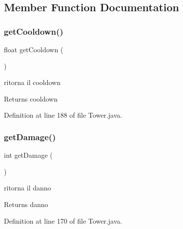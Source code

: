 \subsection{Member Function Documentation}
\mbox{\label{classtowers_1_1_tower_a38fbb6ebbb9c41c0c8d2d62910ac102a}} 
\subsubsection{\texorpdfstring{get\+Cooldown()}{getCooldown()}}
{\footnotesize\ttfamily float get\+Cooldown (\begin{DoxyParamCaption}{ }\end{DoxyParamCaption})}



ritorna il cooldown 

\begin{DoxyReturn}{Returns}
cooldown 
\end{DoxyReturn}


Definition at line 188 of file Tower.\+java.

\mbox{\label{classtowers_1_1_tower_ac10b854131d21646691dcdd7da559a22}} 
\subsubsection{\texorpdfstring{get\+Damage()}{getDamage()}}
{\footnotesize\ttfamily int get\+Damage (\begin{DoxyParamCaption}{ }\end{DoxyParamCaption})}



ritorna il danno 

\begin{DoxyReturn}{Returns}
danno 
\end{DoxyReturn}


Definition at line 170 of file Tower.\+java.

